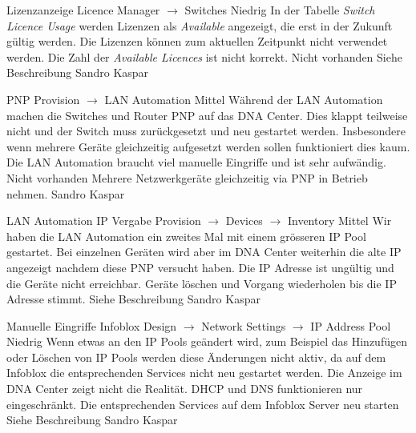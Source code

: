 \bugreport
{Lizenzanzeige}
{Licence Manager $\rightarrow$ Switches}
{Niedrig}
{In der Tabelle \textit{Switch Licence Usage} werden Lizenzen als \textit{Available} angezeigt, die erst in der Zukunft gültig werden.}
{Die Lizenzen können zum aktuellen Zeitpunkt nicht verwendet werden. Die Zahl der \textit{Available Licences} ist nicht korrekt.}
{Nicht vorhanden}
{
	Siehe Beschreibung
}
{Sandro Kaspar}
{}


\bugreport
{PNP}
{Provision $\rightarrow$ LAN Automation}
{Mittel}
{Während der LAN Automation machen die Switches und Router PNP auf das DNA Center. Dies klappt teilweise nicht und der Switch muss zurückgesetzt und neu gestartet werden. Insbesondere wenn mehrere Geräte gleichzeitig aufgesetzt werden sollen funktioniert dies kaum.}
{Die LAN Automation braucht viel manuelle Eingriffe und ist sehr aufwändig.}
{Nicht vorhanden}
{Mehrere Netzwerkgeräte gleichzeitig via PNP in Betrieb nehmen.}
{Sandro Kaspar}
{}


\bugreport
{LAN Automation IP Vergabe}
{Provision $\rightarrow$ Devices $\rightarrow$ Inventory}
{Mittel}
{Wir haben die LAN Automation ein zweites Mal mit einem grösseren IP Pool gestartet. Bei einzelnen Geräten wird aber im DNA Center weiterhin die alte IP angezeigt nachdem diese PNP versucht haben.}
{Die IP Adresse ist ungültig und die Geräte nicht erreichbar.}
{Geräte löschen und Vorgang wiederholen bis die IP Adresse stimmt.}
{
	Siehe Beschreibung
}
{Sandro Kaspar}
{}

\bugreport
{Manuelle Eingriffe Infoblox}
{Design $\rightarrow$ Network Settings $\rightarrow$ IP Address Pool}
{Niedrig}
{Wenn etwas an den IP Pools geändert wird, zum Beispiel das Hinzufügen oder Löschen von IP Pools werden diese Änderungen nicht aktiv, da auf dem Infoblox die entsprechenden Services nicht neu gestartet werden.}
{Die Anzeige im DNA Center zeigt nicht die Realität. DHCP und DNS funktionieren nur eingeschränkt.}
{Die entsprechenden Services auf dem Infoblox Server neu starten}
{
	Siehe Beschreibung
}
{Sandro Kaspar}
{}

